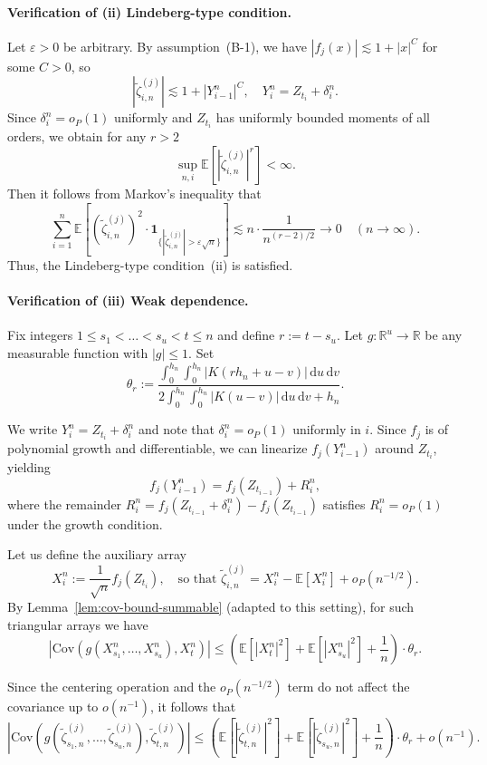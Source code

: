 \documentclass[a4paper,10pt,twoside]{article}
\numberwithin{equation}{section}
\def\l{\left}
\def\r{\right}
\def\E{\mathbb{E}}
\def\Cov{\mathrm{Cov}}
\def\df{\mathrm{d}}
\begin{document}
\paragraph{Verification of (ii) Lindeberg-type condition.}
Let $\varepsilon > 0$ be arbitrary. By assumption~(B-1), we have $|f_j(x)| \lesssim 1 + |x|^C$ for some $C > 0$, so
\[
|\widetilde{\zeta}_{i,n}^{(j)} | \lesssim 1 + |Y_{i-1}^n|^C, \quad Y_i^n = Z_{t_i} + \delta_i^n.
\]
Since $\delta_i^n = o_P(1)$ uniformly and $Z_{t_i}$ has uniformly bounded moments of all orders, we obtain for any $r > 2$
\[
\sup_{n,i} \E\l[ |\widetilde{\zeta}_{i,n}^{(j)} |^r \r] < \infty.
\]
Then it follows from Markov's inequality that 
\[
\sum_{i=1}^n \E\l[ (\widetilde{\zeta}_{i,n}^{(j)} )^2 \cdot \mathbf{1}_{\{ |\widetilde{\zeta}_{i,n}^{(j)} | > \varepsilon \sqrt{n} \}} \r]
\lesssim n \cdot \frac{1}{n^{(r-2)/2}} \to 0 \quad (n \to \infty).
\]
Thus, the Lindeberg-type condition~(ii) is satisfied.


\paragraph{Verification of (iii) Weak dependence.}
Fix integers $1 \le s_1 < \dots < s_u < t \le n$ and define $r := t - s_u$. Let $g : \mathbb{R}^u \to \mathbb{R}$ be any measurable function with $|g| \le 1$. Set
\[
\theta_r := \frac{ \displaystyle \int_0^{h_n} \int_0^{h_n} |K(r h_n + u - v)| \,\df u \,\df v }{
\displaystyle 2 \int_0^{h_n} \int_0^{h_n} |K(u - v)| \,\df u \,\df v + h_n }.
\]

We write $Y_i^n = Z_{t_i} + \delta_i^n$ and note that $\delta_i^n = o_P(1)$ uniformly in $i$. Since $f_j$ is of polynomial growth and differentiable, we can linearize $f_j(Y_{i-1}^n)$ around $Z_{t_i}$, yielding
\[
f_j(Y_{i-1}^n) = f_j(Z_{t_{i-1}}) + R_i^n,
\]
where the remainder $R_i^n = f_j(Z_{t_{i-1}} + \delta_i^n) - f_j(Z_{t_{i-1}})$ satisfies $R_i^n = o_P(1)$ under the growth condition.

Let us define the auxiliary array
\[
X_i^n := \frac{1}{\sqrt{n}} f_j(Z_{t_i}), \quad \text{so that } \widetilde{\zeta}_{i,n}^{(j)} = X_i^n - \E[X_i^n] + o_P(n^{-1/2}).
\]
By Lemma~\ref{lem:cov-bound-summable} (adapted to this setting), for such triangular arrays we have
\[
\l| \Cov\l( g(X_{s_1}^n,\dots,X_{s_u}^n), X_t^n \r) \r| 
\le \l( \E[|X_t^n|^2] + \E[|X_{s_u}^n|^2] + \frac{1}{n} \r) \cdot \theta_r.
\]

Since the centering operation and the $o_P(n^{-1/2})$ term do not affect the covariance up to $o(n^{-1})$, it follows that
\[
\l| \Cov\l( g(\widetilde{\zeta}_{s_1,n}^{(j)}, \dots, \widetilde{\zeta}_{s_u,n}^{(j)}), \widetilde{\zeta}_{t,n}^{(j)} \r) \r| 
\le \l( \E[|\widetilde{\zeta}_{t,n}^{(j)}|^2] + \E[|\widetilde{\zeta}_{s_u,n}^{(j)}|^2] + \frac{1}{n} \r) \cdot \theta_r + o(n^{-1}).
\]
\end{document}
